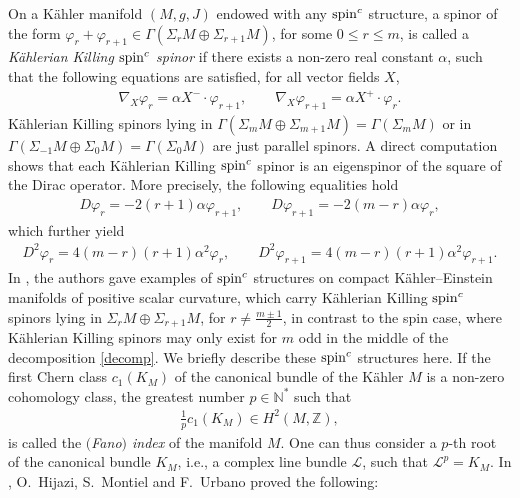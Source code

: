 \documentclass[pdftex]{sigma}
\numberwithin{equation}{section}
\theoremstyle{definition}
\begin{document}
On a K\"ahler manifold $(M,g,J)$  endowed with any ${\mathop{\rm spin}^c}$ structure,  a spinor of the form $\varphi_r+\varphi_{r+1}\in \Gamma(\Sigma_r M\oplus \Sigma_{r+1} M)$, for some $0\leq r\leq m$, is called a {\it   K\"ahlerian Killing ${\mathop{\rm spin}^c}$ spinor} if  there exists a non-zero real constant $\alpha$, such that the following equations are satisf\/ied, for all vector f\/ields $X$,
 \begin{gather}\label{KKSSdefinition}
   \nabla_X\varphi_r=  \alpha  X^-\cdot\varphi_{r+1},\qquad
   \nabla_X\varphi_{r+1} =  \alpha    X^+\cdot\varphi_{r}.
 \end{gather}
K\"ahlerian Killing spinors lying in $\Gamma(\Sigma_{m} M\oplus \Sigma_{m+1} M) = \Gamma(\Sigma_m M)$  or in  $\Gamma(\Sigma_{-1} M\oplus \Sigma_{0} M) = \Gamma(\Sigma_0 M)$ are just parallel spinors. A direct computation shows that each  K\"ahlerian Killing ${\mathop{\rm spin}^c}$ spinor is an eigenspinor of the square of the Dirac operator. More precisely, the following equalities hold
 \begin{gather}\label{kkseigen1}
   D\varphi_r= -2(r+1)\alpha  \varphi_{r+1},\qquad D\varphi_{r+1}= -2(m-r)\alpha \varphi_{r},
 \end{gather}
which further yield
\begin{gather}\label{kkseigen2}
D^2\varphi_r=4(m-r)(r+1)\alpha^2\varphi_r,\qquad D^2\varphi_{r+1}=4(m-r)(r+1)\alpha^2\varphi_{r+1}.
 \end{gather}
In \cite{hmu}, the authors gave examples of ${\mathop{\rm spin}^c}$ structures on compact K\"ahler--Einstein  manifolds of positive scalar curvature, which carry  K\"ahlerian Killing ${\mathop{\rm spin}^c}$ spinors lying in $\Sigma_r M\oplus \Sigma_{r+1} M$, for $r\neq \frac{m\pm1}{2}$, in contrast to the spin case, where K\"ahlerian Killing spinors may only exist for $m$ odd in the middle of the decomposition \eqref{decomp}. We brief\/ly describe  these ${\mathop{\rm spin}^c}$ structures here. If the f\/irst Chern class $c_1(K_M)$ of the canonical bundle of
the K\"ahler $M$ is a non-zero cohomology class,  the greatest number $p\in \mathbb N^*$ such that
\begin{gather*}
\frac 1p c_1 (K_M) \in H^2 (M, \mathbb Z),
\end{gather*}
is called the {\it $($Fano$)$ index} of the manifold $M$. One can thus consider a $p$-th root of the canonical bundle $K_M$, i.e.,
 a complex line bundle $\mathcal L$, such that $\mathcal L^ p = K_M$. In \cite{hmu}, O.~Hijazi, S.~Montiel and F.~Urbano proved the following:
\end{document}
